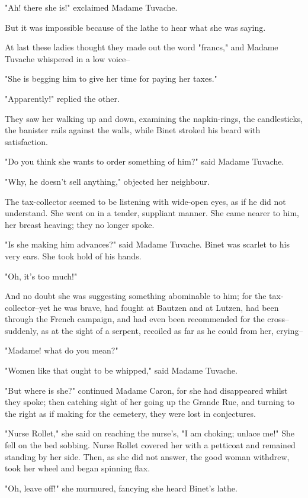 \documentclass{tufte-book}
\begin{document}
"Ah! there she is!" exclaimed Madame Tuvache.

But it was impossible because of the lathe to hear what she was saying.

At last these ladies thought they made out the word "francs," and Madame
Tuvache whispered in a low voice--

"She is begging him to give her time for paying her taxes."

"Apparently!" replied the other.

They saw her walking up and down, examining the napkin-rings, the
candlesticks, the banister rails against the walls, while Binet stroked
his beard with satisfaction.

"Do you think she wants to order something of him?" said Madame Tuvache.

"Why, he doesn't sell anything," objected her neighbour.

The tax-collector seemed to be listening with wide-open eyes, as if he
did not understand. She went on in a tender, suppliant manner. She came
nearer to him, her breast heaving; they no longer spoke.

"Is she making him advances?" said Madame Tuvache. Binet was scarlet to
his very ears. She took hold of his hands.

"Oh, it's too much!"

And no doubt she was suggesting something abominable to him; for the
tax-collector--yet he was brave, had fought at Bautzen and at Lutzen,
had been through the French campaign, and had even been recommended for
the cross--suddenly, as at the sight of a serpent, recoiled as far as he
could from her, crying--

"Madame! what do you mean?"

"Women like that ought to be whipped," said Madame Tuvache.

"But where is she?" continued Madame Caron, for she had disappeared
whilst they spoke; then catching sight of her going up the Grande Rue,
and turning to the right as if making for the cemetery, they were lost
in conjectures.

"Nurse Rollet," she said on reaching the nurse's, "I am choking; unlace
me!" She fell on the bed sobbing. Nurse Rollet covered her with a
petticoat and remained standing by her side. Then, as she did not
answer, the good woman withdrew, took her wheel and began spinning flax.

"Oh, leave off!" she murmured, fancying she heard Binet's lathe.
\end{document}
